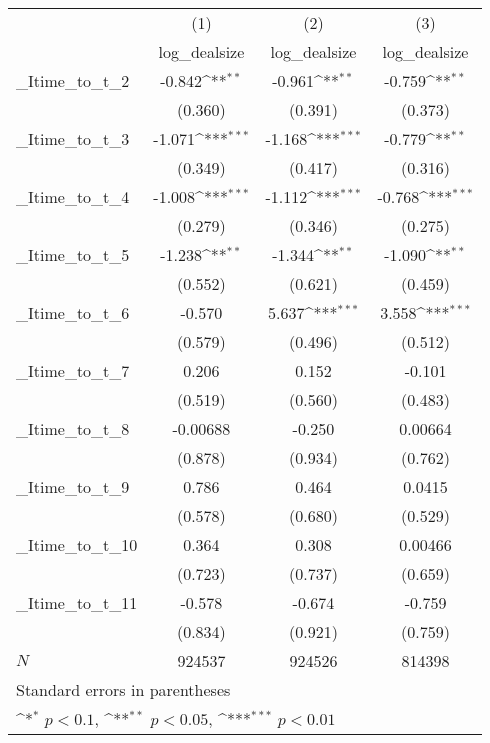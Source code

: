 {
\def\sym#1{\ifmmode^{#1}\else\(^{#1}\)\fi}
\begin{tabular}{l*{3}{c}}
\hline\hline
            &\multicolumn{1}{c}{(1)}&\multicolumn{1}{c}{(2)}&\multicolumn{1}{c}{(3)}\\
            &\multicolumn{1}{c}{log\_dealsize}&\multicolumn{1}{c}{log\_dealsize}&\multicolumn{1}{c}{log\_dealsize}\\
\hline
\_Itime\_to\_t\_2&      -0.842\sym{**} &      -0.961\sym{**} &      -0.759\sym{**} \\
            &     (0.360)         &     (0.391)         &     (0.373)         \\
[1em]
\_Itime\_to\_t\_3&      -1.071\sym{***}&      -1.168\sym{***}&      -0.779\sym{**} \\
            &     (0.349)         &     (0.417)         &     (0.316)         \\
[1em]
\_Itime\_to\_t\_4&      -1.008\sym{***}&      -1.112\sym{***}&      -0.768\sym{***}\\
            &     (0.279)         &     (0.346)         &     (0.275)         \\
[1em]
\_Itime\_to\_t\_5&      -1.238\sym{**} &      -1.344\sym{**} &      -1.090\sym{**} \\
            &     (0.552)         &     (0.621)         &     (0.459)         \\
[1em]
\_Itime\_to\_t\_6&      -0.570         &       5.637\sym{***}&       3.558\sym{***}\\
            &     (0.579)         &     (0.496)         &     (0.512)         \\
[1em]
\_Itime\_to\_t\_7&       0.206         &       0.152         &      -0.101         \\
            &     (0.519)         &     (0.560)         &     (0.483)         \\
[1em]
\_Itime\_to\_t\_8&    -0.00688         &      -0.250         &     0.00664         \\
            &     (0.878)         &     (0.934)         &     (0.762)         \\
[1em]
\_Itime\_to\_t\_9&       0.786         &       0.464         &      0.0415         \\
            &     (0.578)         &     (0.680)         &     (0.529)         \\
[1em]
\_Itime\_to\_t\_10&       0.364         &       0.308         &     0.00466         \\
            &     (0.723)         &     (0.737)         &     (0.659)         \\
[1em]
\_Itime\_to\_t\_11&      -0.578         &      -0.674         &      -0.759         \\
            &     (0.834)         &     (0.921)         &     (0.759)         \\
\hline
\(N\)       &      924537         &      924526         &      814398         \\
\hline\hline
\multicolumn{4}{l}{\footnotesize Standard errors in parentheses}\\
\multicolumn{4}{l}{\footnotesize \sym{*} \(p<0.1\), \sym{**} \(p<0.05\), \sym{***} \(p<0.01\)}\\
\end{tabular}
}
